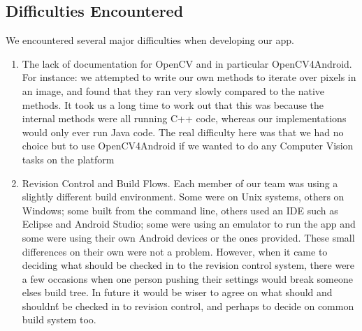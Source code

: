     \subsection{Difficulties Encountered}
    We encountered several major difficulties when developing our app.
    \begin{enumerate}
        \item{The lack of documentation for OpenCV and in particular OpenCV4Android. For instance: we attempted to write our own methods to iterate over pixels in an image, and found that they ran very slowly compared to the native methods. It took us a long time to work out that this was because the internal methods were all running C++ code, whereas our implementations would only ever run Java code. The real difficulty here was that we had no choice but to use
            OpenCV4Android if we wanted to do any Computer Vision tasks on the platform}
    \item{Revision Control and Build Flows. Each member of our team was using a slightly different build environment. Some were on Unix systems, others on Windows; some built from the command line, others used an IDE such as Eclipse and Android Studio; some were using an emulator to run the app and some were using their own Android devices or the ones provided. These small differences on their own were not a problem. However, when it came to deciding what should be checked in
            to the revision control system, there were a few occasions when one person pushing their settings would break someone elses build tree. In future it would be wiser to agree on what should and shouldn\'t be checked in to revision control, and perhaps to decide on common build system too.} 



    \end{enumerate}

